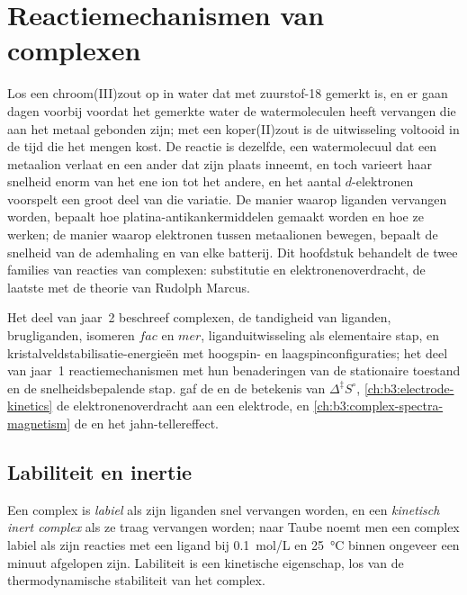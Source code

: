 \chapter{Reactiemechanismen van complexen}\label{ch:b3:complex-mechanisms}

Los een chroom(III)zout op in water dat met zuurstof-18 gemerkt is, en er
gaan dagen voorbij voordat het gemerkte water de watermoleculen heeft
vervangen die aan het metaal gebonden zijn; met een koper(II)zout is de
uitwisseling voltooid in de tijd die het mengen kost. De reactie is
dezelfde, een watermolecuul dat een metaalion verlaat en een ander dat
zijn plaats inneemt, en toch varieert haar snelheid enorm van het ene
ion tot het andere, en het aantal $d$-elektronen voorspelt een groot deel van die variatie. De manier
waarop liganden vervangen worden, bepaalt hoe platina-antikankermiddelen
gemaakt worden en hoe ze werken; de manier waarop elektronen tussen
metaalionen bewegen, bepaalt de snelheid van de ademhaling en van elke
batterij. Dit hoofdstuk behandelt de twee families van reacties van
complexen: substitutie en elektronenoverdracht, de laatste met de theorie
van Rudolph Marcus.

\begin{recall}
Het deel van jaar~2 beschreef complexen, de tandigheid van liganden,
brugliganden, isomeren $fac$ en $mer$, liganduitwisseling als elementaire stap, en
kristalveldstabilisatie-energieën met hoogspin- en
laagspinconfiguraties; het deel van jaar~1 reactiemechanismen met hun
benaderingen van de stationaire toestand en de snelheidsbepalende stap.
 gaf de  en de
betekenis van $\Delta^{\ddagger}S^\circ$, \cref{ch:b3:electrode-kinetics} de elektronenoverdracht aan een
elektrode, en \cref{ch:b3:complex-spectra-magnetism} de 
en het jahn-tellereffect.
\end{recall}

\section{Labiliteit en inertie}

\begin{definition}\label{def:b3:complex-mechanisms:labile}
Een complex is \emph{labiel} als zijn liganden snel
vervangen worden, en een
\emph{kinetisch inert complex}
als ze traag vervangen worden; naar Taube noemt men een complex labiel
als zijn reacties met een ligand bij \qty{0.1}{mol/L} en \qty{25}{\celsius} binnen ongeveer een
minuut afgelopen zijn. Labiliteit is een kinetische eigenschap, los van
de thermodynamische stabiliteit van het complex.
\end{definition}

